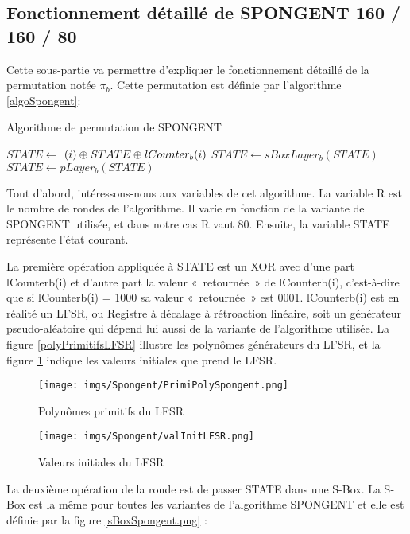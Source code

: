 		\subsection{Fonctionnement détaillé de SPONGENT 160 / 160 / 80}
		Cette sous-partie va permettre d’expliquer le fonctionnement détaillé de la permutation notée $\pi_{b}$.
		Cette permutation est définie par l’algorithme \ref{algoSpongent}:
		\begin{algorithm}
			\caption{Algorithme de permutation de SPONGENT}
			\label{algoSpongent}
			\begin{algorithmic}
					\STATE $ STATE \leftarrow $ $(i) \mathbin{\oplus} STATE \mathbin{\oplus} lCounter_{b}(i)$
					\STATE $ STATE \leftarrow sBoxLayer_{b}(STATE)$
					\STATE $ STATE \leftarrow pLayer_{b}(STATE)$
				\ENDFOR
			\end{algorithmic}
		\end{algorithm}

		Tout d’abord, intéressons-nous aux variables de cet algorithme.
		La variable R est le nombre de rondes de l’algorithme. Il varie en fonction de la variante de SPONGENT utilisée, et dans notre cas R vaut 80.
		Ensuite, la variable STATE représente l’état courant.
		
		La première opération appliquée à STATE est un XOR avec d’une part lCounterb(i) et d’autre part la valeur « retournée » de lCounterb(i),
		c’est-à-dire que si lCounterb(i) = 1000 sa valeur « retournée » est 0001. lCounterb(i) est en réalité un LFSR, ou Registre à décalage à rétroaction linéaire,
		soit un générateur pseudo-aléatoire qui dépend lui aussi de la variante de l’algorithme utilisée.
		La figure \ref{polyPrimitifsLFSR} illustre les polynômes générateurs du LFSR, et la figure \ref{valInitLFSR} indique les valeurs initiales que prend le LFSR.

		\begin{figure}[!htb]
			\begin{minipage}{0.48\textwidth}
			  \centering
			  \texttt{[image: imgs/Spongent/PrimiPolySpongent.png]}
			  \caption{Polynômes primitifs du LFSR}
			  \label{polyPrimitifsLFSR}
			\end{minipage}
			\hfill
			\begin {minipage}{0.48\textwidth}
			  \centering
			  \texttt{[image: imgs/Spongent/valInitLFSR.png]}
			  \caption{Valeurs initiales du LFSR}
			  \label{valInitLFSR}
			\end{minipage}
		 \end{figure}
		La deuxième opération de la ronde est de passer STATE dans une S-Box.
		La S-Box est la même pour toutes les variantes de l’algorithme SPONGENT et elle est définie par la figure \ref{sBoxSpongent.png} :
		
